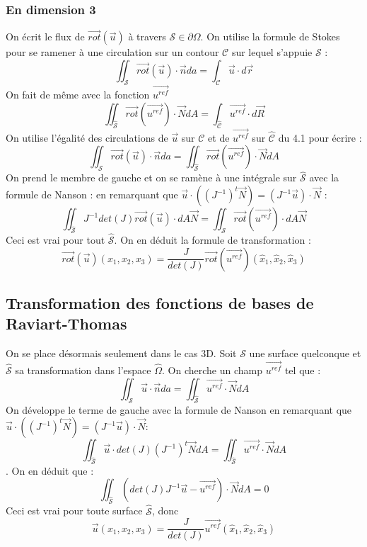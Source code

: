 \documentclass[a4paper,12pt]{article}
\begin{document}
\subsubsection{En dimension 3}
On écrit le flux de $\vec{rot}(\vec{u})$ à travers $\mathcal{S} \in \partial \Omega$. On utilise la formule de Stokes pour se ramener à une circulation 
sur un contour $\mathcal{C}$ sur lequel s'appuie $\mathcal{S}$ : 
\[
\iint_{\mathcal{S}} {\vec{rot}(\vec{u}) \cdot \vec{n} da} = \int_{\mathcal{C}}{\vec{u} \cdot d\vec{r}}
\]
On fait de même avec la fonction $\vec{u^{ref}}$
\[
\iint_{\hat{\mathcal{S}}} {\vec{rot}(\vec{u^{ref}}) \cdot \vec{N}dA} = \int_{\hat{\mathcal{C}}}{\vec{u^{ref}} \cdot d\vec{R}}
\]
On utilise l'égalité des circulations de $\vec{u}$ sur $\mathcal{C}$ 
et de $\vec{u^{ref}}$ sur $\hat{\mathcal{C}}$ du 4.1 pour écrire :
\[
\iint_{\mathcal{S}} {\vec{rot}(\vec{u}) \cdot\vec{n} da} = \iint_{\hat{\mathcal{S}}} {\vec{rot}(\vec{u^{ref}}) \cdot \vec{N} dA}
\]
On prend le membre de gauche et on se ramène à une intégrale sur $\hat{\mathcal{S}}$ avec la formule de Nanson  :
en remarquant que $\vec{u} \cdot \left((J^{-1})^{t} \vec{N}\right) = \left(J^{-1} \vec{u}\right) \cdot \vec{N}$ : 
\[
\iint_{\hat{\mathcal{S}}} {J^{-1}det(J) \vec{rot}(\vec{u}) \cdot dA\vec{N}} = \iint_{\hat{\mathcal{S}}} {\vec{rot}(\vec{u^{ref}}) \cdot dA\vec{N}}
\]
Ceci est vrai pour tout $\hat{\mathcal{S}}$. On en déduit la formule de transformation : 
$$\boxed{\vec{rot}(\vec{u})(x_{1},x_{2},x_{3}) = \frac{J}{det(J)}\vec{rot}(\vec{u^{ref}})(\hat{x}_{1},\hat{x}_{2},\hat{x}_{3})}$$
\subsection{Transformation des fonctions de bases de Raviart-Thomas}
On se place désormais seulement dans le cas 3D. Soit $\mathcal{S}$ une surface quelconque et $\hat{\mathcal{S}}$ sa transformation dans l'espace $\hat{\Omega}$.
On cherche un champ $\vec{u^{ref}}$ tel que :
\[
\iint_{\mathcal{S}} {\vec{u}\cdot \vec{n} da} = \iint_{\hat{\mathcal{S}}} {\vec{u^{ref}}\cdot \vec{N}dA}
\]
On développe le terme de gauche avec la formule de Nanson en remarquant que $\vec{u} \cdot \left((J^{-1})^{t} \vec{N}\right) = \left(J^{-1} \vec{u}\right) \cdot \vec{N}$:
\[
\iint_{\hat{\mathcal{S}}} {\vec{u}\cdot det(J) (J^{-1})^{t} \vec{N} dA} = \iint_{\hat{\mathcal{S}}} {\vec{u^{ref}}\cdot \vec{N} dA}
\]
. On en déduit que :
\[
\iint_{\hat{\mathcal{S}}} {\left(det(J) J^{-1} \vec{u} - \vec{u^{ref}}\right) \cdot  \vec{N} dA} = 0
\]
Ceci est vrai pour toute surface $\hat{\mathcal{S}}$, donc
$$\boxed{\vec{u} (x_{1},x_{2},x_{3})= \frac{J}{det(J)}\vec{u^{ref}}(\hat{x}_{1},\hat{x}_{2},\hat{x}_{3})}$$
\end{document}
